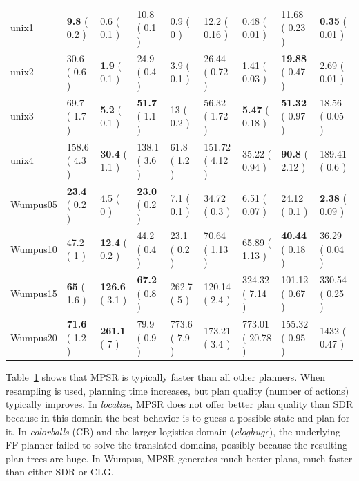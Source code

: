 \documentclass[letterpaper]{article}
\numberwithin{equation}{section}	%
\begin{document}
\begin{table}[htb]
\begin{tabular}{|l||l|l||l|l||l|l||l|l|}
unix1	&	\textbf{9.8}	(	0.2	)&	0.6	(	0.1	)&			10.8	(	0.1	)&	0.9	(	0	)&		12.2	(	0.16	)&	0.48	(	0.01	)&		11.68	(	 0.23	)&	\textbf{0.35}	(	 0.01 )	\\
unix2	&	30.6	(	0.6	)&	\textbf{1.9}	(	0.1	)&			24.9	(	0.4	)&	3.9	(	0.1	)&		26.44	(	0.72	)&	1.41	(	0.03	)&		 \textbf{19.88}	(	0.47	)&	2.69	 (	0.01	)\\
unix3	&	69.7	(	1.7	)&	\textbf{5.2}	(	0.1	)&			\textbf{51.7}	(	1.1	)&	13	(	0.2	)&		56.32	(	1.72	)&	\textbf{5.47}	(	0.18	)&		 \textbf{51.32}	(	0.97	 )&	18.56	(	0.05	)\\
unix4	&	158.6	(	4.3	)&	\textbf{30.4}	(	1.1	)&			138.1	(	3.6	)&	61.8	(	1.2	)&		151.72	(	4.12	)&	35.22	(	0.94	)&		 \textbf{90.8}	(	2.12	)&	 189.41	(	0.6	)\\
\hline

Wumpus05	&	\textbf{23.4}	(	0.2	)&	4.5	(	0	)&			\textbf{23.0}	(	0.2	)&	7.1	(	0.1	)&		34.72	(	0.3	)&	6.51	(	0.07	)&		24.12	 (	0.1	)&	\textbf{2.38}	 (	0.09	)\\
Wumpus10	&	47.2	(	1	)&	\textbf{12.4}	(	0.2	)&			44.2	(	0.4	)&	23.1	(	0.2	)&		70.64	(	1.13	)&	65.89	(	1.13	)&		 \textbf{40.44}	(	0.18	)&	 36.29	(	0.04	 )\\
Wumpus15	&	\textbf{65}	(	1.6	)&	\textbf{126.6}	(	3.1	)&			\textbf{67.2}	(	0.8	)&	262.7	(	5	)&		120.14	(	2.4	)&	324.32	(	7.14	)&		 101.12	(	0.67	)&	 330.54	(	0.25	 )\\
Wumpus20	&	\textbf{71.6}	(	1.2	)&	\textbf{261.1}	(	7	)&			79.9	(	0.9	)&	773.6	(	7.9	)&		173.21	(	3.4	)&	773.01	(	20.78	)&		 155.32	(	0.95	)&	1432	 (	0.47	 )\\
\hline
\end{tabular}
\label{tbl:Results}
\end{table}

Table~\ref{tbl:Results} shows that MPSR is typically faster than all other planners. When resampling is used,  planning time increases, but plan quality (number of actions) typically improves. In \emph{localize}, MPSR does not offer better plan quality than SDR because in this domain the best behavior is to guess a possible state and plan for it. In \emph{colorballs} (CB) and the larger logistics domain (\emph{cloghuge}), the underlying FF planner failed to solve the translated domains, possibly because the resulting plan trees are huge. In Wumpus, MPSR generates much better plans, much faster than either SDR or CLG.
\end{document}
